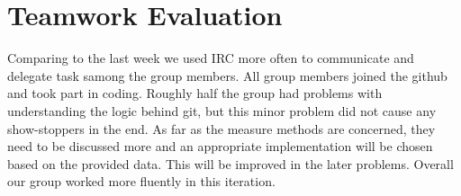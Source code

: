\section{Teamwork Evaluation}
Comparing to the last week we used IRC more often to communicate and delegate task samong the group members. All group members joined the github and took part in coding. Roughly half the group had problems with understanding the logic behind git, but this minor problem did not cause any show-stoppers in the end. As far as the measure methods are concerned, they need to be discussed more and an appropriate implementation will be chosen based on the provided data. This will be improved in the later problems. Overall our group worked more fluently in this iteration.
 